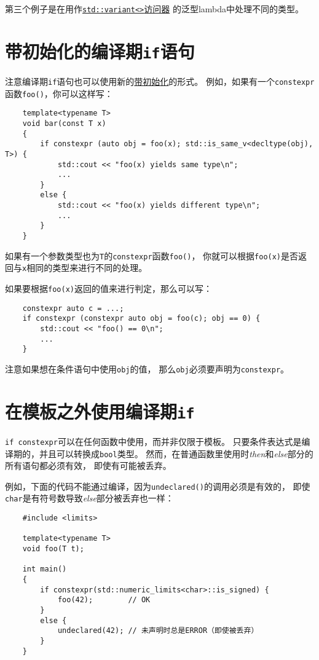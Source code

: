 第三个例子是在用作\hyperref[ch16.3.3.2]{\texttt{std::variant<>}访问器}
的泛型lambda中处理不同的类型。

\section{带初始化的编译期\texttt{if}语句}
注意编译期\texttt{if}语句也可以使用新的\hyperref[ch2]{带初始化}的形式。
例如，如果有一个\texttt{constexpr}函数\texttt{foo()}，你可以这样写：
\begin{lstlisting}
    template<typename T>
    void bar(const T x)
    {
        if constexpr (auto obj = foo(x); std::is_same_v<decltype(obj), T>) {
            std::cout << "foo(x) yields same type\n";
            ...
        }
        else {
            std::cout << "foo(x) yields different type\n";
            ...
        }
    }
\end{lstlisting}
如果有一个参数类型也为\texttt{T}的\texttt{constexpr}函数\texttt{foo()}，
你就可以根据\texttt{foo(x)}是否返回与\texttt{x}相同的类型来进行不同的处理。

如果要根据\texttt{foo(x)}返回的值来进行判定，那么可以写：
\begin{lstlisting}
    constexpr auto c = ...;
    if constexpr (constexpr auto obj = foo(c); obj == 0) {
        std::cout << "foo() == 0\n";
        ...
    }
\end{lstlisting}
注意如果想在条件语句中使用\texttt{obj}的值，
那么\texttt{obj}必须要声明为\texttt{constexpr}。

\section{在模板之外使用编译期\texttt{if}}
\texttt{if constexpr}可以在任何函数中使用，而并非仅限于模板。
只要条件表达式是编译期的，并且可以转换成\texttt{bool}类型。
然而，在普通函数里使用时\emph{then}和\emph{else}部分的所有语句都必须有效，
即使有可能被丢弃。

例如，下面的代码不能通过编译，因为\texttt{undeclared()}的调用必须是有效的，
即使\texttt{char}是有符号数导致\emph{else}部分被丢弃也一样：
\begin{lstlisting}
    #include <limits>

    template<typename T>
    void foo(T t);

    int main()
    {
        if constexpr(std::numeric_limits<char>::is_signed) {
            foo(42);        // OK
        }
        else {
            undeclared(42); // 未声明时总是ERROR（即使被丢弃）
        }
    }
\end{lstlisting}

